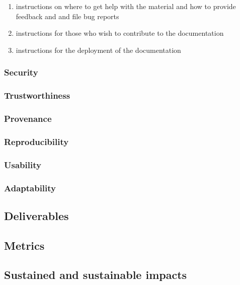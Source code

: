 \begin{enumerate}
    \item instructions on where to get help with the material and how to provide feedback and and file bug reports
    \item instructions for those who wish to contribute to the documentation
    \item instructions for the deployment of the documentation
\end{enumerate}






\subsubsection{Security}

\subsubsection{Trustworthiness}

\subsubsection{Provenance}

\subsubsection{Reproducibility}

\subsubsection{Usability}

\subsubsection{Adaptability}

\subsection{Deliverables}


\subsection{Metrics}


\subsection{Sustained and sustainable impacts}
